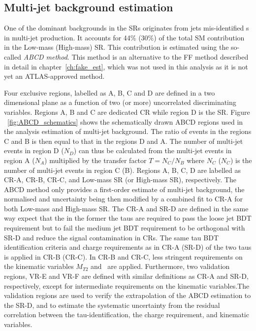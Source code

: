 	\subsection*{Multi-jet background estimation}
	\label{subsec:ABCD_method}
	
	One of the dominant backgrounds in the \acp{SR} originates from jets mis-identified \ltau s in multi-jet production. It accounts for 44\% (30\%) of the total \ac{SM} contribution in the Low-mass (High-mass) \ac{SR}.
	This contribution is estimated using the so-called \textit{ABCD method}. 
	This method is an alternative to the \ac{FF} method described in detail in chapter~\ref{ch:fake_est}, which was not used in this analysis as it is not yet an \ac{ATLAS}-approved method.
	
	\ABCDschematics	
	Four exclusive regions, labelled as A, B, C  and D are defined in a two dimensional plane as a function of two (or more) uncorrelated discriminating variables. Regions A, B and C are dedicated \ac{CR} while region D is the \ac{SR}.  Figure ~\ref{fig:ABCD_schematics} shows the schematically drawn ABCD regions used in the analysis estimation of multi-jet  background.
	 The ratio of events in the regions C and B is then equal to that in the regions D and A.
	The number of multi-jet events in region D ($N_D$) can thus be calculated from the multi-jet events in region A ($N_A$) multiplied by the transfer factor $T=N_C/N_B$ where $N_C$ ($N_C$) is the number of multi-jet events in region C (B). Regions A, B, C, D are labelled as \ac{CR}-A, \ac{CR}-B, \ac{CR}-C, and Low-mass \ac{SR} (or  High-mass \ac{SR}), respectively. The ABCD method only provides a first-order estimate of multi-jet background, the normalised and uncertainty being then modified by a combined fit to \ac{CR}-A 	for both Low-mass and High-mass \ac{SR}. 
	The \ac{CR}-A and \ac{SR}-D are defined in the same way expect that the in the former the taus are required to pass the loose jet \ac{BDT} requirement but to fail the medium jet \ac{BDT} requirement to be orthogonal with \ac{SR}-D and reduce the signal contamination in \acp{CR}. The same tau \ac{BDT} identification criteria and charge requirements as in \ac{CR}-A (\ac{SR}-D) of the two taus is applied in \ac{CR}-B (\ac{CR}-C). In \ac{CR}-B and  \ac{CR}-C, less stringent requirements on the kinematic variables $M_{T2}$ and \met\ are applied. Furthermore, two validation regions, \ac{VR}-E and \ac{VR}-F are defined with similar definitions as  \ac{CR}-A and  \ac{SR}-D, respectively, except for intermediate requirements on the kinematic variables.The validation regions are used to verify the extrapolation of the ABCD estimation to the \ac{SR}-D, and to estimate the systematic uncertainty from the residual correlation between the tau-identification, the charge requirement, and kinematic variables. 

